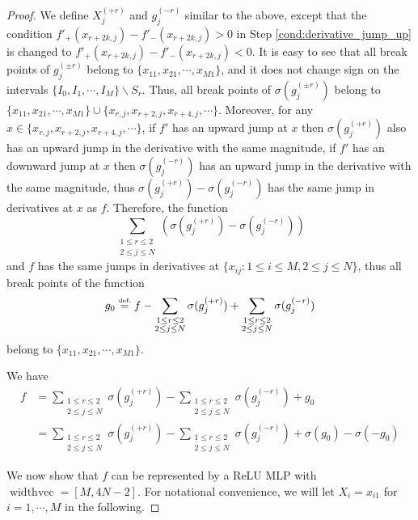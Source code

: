 \documentclass{article}
\numberwithin{equation}{section}
\theoremstyle{definition}
\newcommand{\eqdef}{\ensuremath{\stackrel{\mbox{\upshape\tiny def.}}{=}}}
\begin{document}
\begin{proof}
We define $X_j^{(+r)}$ and $g_j^{(-r)}$ similar to the above, except that the condition $f'_+(x_{r+2k,j}) - f'_-(x_{r+2k,j}) > 0$ in Step \ref{cond:derivative_jump_up} is changed to $f'_+(x_{r+2k,j}) - f'_-(x_{r+2k,j}) < 0$. It is easy to see that all break points of $g_j^{(\pm r)}$ belong to $\{x_{11},x_{21},\cdots,x_{M1}\}$, and it does not change sign on the intervals $\{I_0,I_1,\cdots,I_M\} \backslash S_r$. Thus, all break points of $\sigma(g_j^{(\pm r)})$ belong to $\{x_{11},x_{21},\cdots,x_{M1}\} \cup \{x_{r,j},x_{r+2,j},x_{r+4,j},\cdots\}$. Moreover, for any $x\in\{x_{r,j},x_{r+2,j},x_{r+4,j},\cdots\}$, if $f'$ has an upward jump at $x$ then $\sigma(g_j^{(+r)})$ also has an upward jump in the derivative with the same magnitude, if $f'$ has an downward jump at $x$ then $\sigma(g_j^{(-r)})$ has an upward jump in the derivative with the same magnitude, thus $\sigma(g_j^{(+r)}) - \sigma(g_j^{(-r)})$ has the same jump in derivatives at $x$ as $f$. Therefore, the function 
\[
    \sum_{\substack{1\le r\le 2 \\ 2\le j\le N}} 
    \left(\sigma(g_j^{(+r)}) - \sigma(g_j^{(-r)})\right)
\]
and $f$ has the same jumps in derivatives at $\{x_{ij}: 1\le i\le M, 2\le j\le N \}$, thus all break points of the function 
\[
    g_0 \eqdef f - 
    \sum_{\substack{1\le r\le 2 \\ 2\le j\le N}} 
    \sigma(g_j^{(+r)})
    +
    \sum_{\substack{1\le r\le 2 \\ 2\le j\le N}} 
    \sigma(g_j^{(-r)})
\]
belong to $\{x_{11},x_{21},\cdots,x_{M1}\}$.

We have 
\begin{align}
\label{decomposition_of_approximant_function}
    f
    &= 
    \sum_{\substack{1\le r\le 2 \\ 2\le j\le N}} 
    \sigma(g_j^{(+r)})
    -
    \sum_{\substack{1\le r\le 2 \\ 2\le j\le N}} 
    \sigma(g_j^{(-r)})
    + g_0  \nonumber  \\
    &= 
    \sum_{\substack{1\le r\le 2 \\ 2\le j\le N}} 
    \sigma(g_j^{(+r)})
    -
    \sum_{\substack{1\le r\le 2 \\ 2\le j\le N}} 
    \sigma(g_j^{(-r)})
    + \sigma(g_0) - \sigma(-g_0)
\end{align}

We now show that $f$ can be represented by a ReLU MLP with $\operatorname{widthvec}=[M,4N-2]$. For notational convenience, we will let $X_i=x_{i1}$ for $i=1,\cdots,M$ in the following.


\end{proof}
\end{document}
